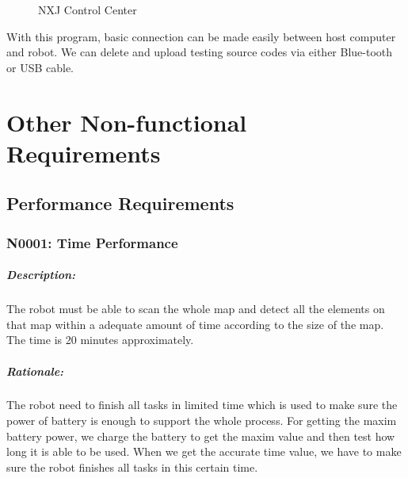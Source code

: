 \documentclass[11pt, a4paper]{report}
\begin{document}
\begin{figure}[ht]
\centering
\setlength\fboxsep{2pt}
\setlength\fboxrule{0.2pt}
\caption{NXJ Control Center}
\label{sec:NXJCC}
\label{fig:NXJCC}
\end{figure}
With this program, basic connection can be made easily between host computer and robot. 
We can delete and upload testing source codes via either Blue-tooth or USB cable.
\pagebreak



\chapter{Other Non-functional Requirements}


\section{Performance Requirements}

\subsection{N0001: Time Performance}
\paragraph{Description:}
The robot must be able to scan the whole map and detect all the elements on that map within a adequate amount of time according to the size of the map. The time is 20 minutes approximately. 
\paragraph{Rationale:}
The robot need to finish all tasks in limited time which is used to make sure the power of battery is enough to support the whole process. For getting the maxim battery power, we charge the battery to get the maxim value and then test how long it is able to be used. When we get the accurate time value, we have to make sure the robot finishes all tasks in this certain time.   
\end{document}
